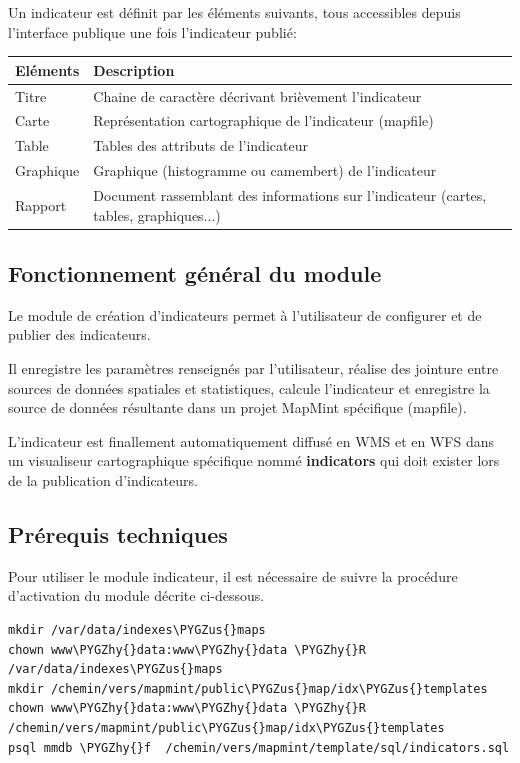 \documentclass[letterpaper,10pt,french]{sphinxmanual}
\def\PYGZus{\char`\_}
\def\PYGZhy{\char`\-}
\begin{document}
Un indicateur est définit par les éléments suivants, tous accessibles
depuis l'interface publique une fois l'indicateur publié:

\begin{tabulary}{\linewidth}{|L|L|}
\hline

\textbf{Eléments}
 & 
\textbf{Description}
\\
\hline
Titre
 & 
Chaine de caractère décrivant brièvement l'indicateur
\\
\hline
Carte
 & 
Représentation cartographique de l'indicateur (mapfile)
\\
\hline
Table
 & 
Tables des attributs de l'indicateur
\\
\hline
Graphique
 & 
Graphique (histogramme ou camembert) de l'indicateur
\\
\hline
Rapport
 & 
Document rassemblant des informations sur l'indicateur (cartes, tables, graphiques...)
\\
\hline\end{tabulary}



\subsection{Fonctionnement général du module}
\label{indicators/presentation:fonctionnement-general-du-module}
Le module de création d'indicateurs permet à l'utilisateur de configurer et de publier des indicateurs.

Il enregistre les paramètres renseignés par l'utilisateur, réalise des
jointure entre sources de données spatiales et statistiques, calcule
l'indicateur et enregistre la source de données résultante dans un
projet MapMint spécifique (mapfile).

L'indicateur est finallement automatiquement diffusé en WMS et en WFS
dans un visualiseur cartographique spécifique nommé \textbf{indicators} qui
doit exister lors de la publication d'indicateurs.


\subsection{Prérequis techniques}
\label{indicators/presentation:prerequis-techniques}
Pour utiliser le module indicateur, il est nécessaire de suivre la
procédure d'activation du module décrite ci-dessous.

\begin{Verbatim}[commandchars=\\\{\}]
mkdir /var/data/indexes\PYGZus{}maps
chown www\PYGZhy{}data:www\PYGZhy{}data \PYGZhy{}R /var/data/indexes\PYGZus{}maps
mkdir /chemin/vers/mapmint/public\PYGZus{}map/idx\PYGZus{}templates
chown www\PYGZhy{}data:www\PYGZhy{}data \PYGZhy{}R /chemin/vers/mapmint/public\PYGZus{}map/idx\PYGZus{}templates
psql mmdb \PYGZhy{}f  /chemin/vers/mapmint/template/sql/indicators.sql
\end{Verbatim}
\end{document}
